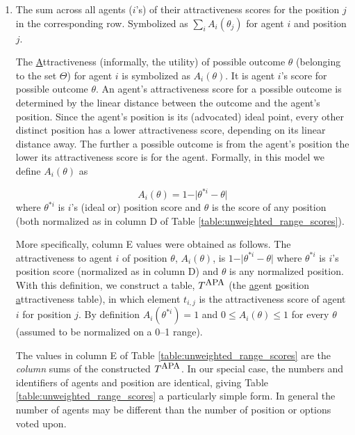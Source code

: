 \begin{enumerate}
\item  The sum across all agents ($i$'s) of their   {attractiveness} scores for the   {position} $j$ in the corresponding row. Symbolized as $\sum_i A_i(\theta_j)$ for agent $i$ and position $j$.

The \underline{A}ttractiveness (informally, the utility) of possible outcome $\theta$ (belonging to the set $\Theta$) for agent $i$ is symbolized as $A_i(\theta)$. It is agent $i$'s score for possible outcome $\theta$. An agent's   {attractiveness} score for a possible outcome is determined by the linear distance between the outcome and the agent's   {position}. Since the agent's   {position} is its (advocated) ideal point, every other distinct position has a lower   {attractiveness} score, depending on its linear distance away. The further a possible outcome is from the agent's   {position} the lower its   {attractiveness} score is for the agent. Formally, in this model we define $A_i(\theta)$ as

\begin{equation}
A_i(\theta) = 1-\vert \theta^{*i} - \theta\vert 
\end{equation}
 where $\theta^{*i}$ is $i$'s (ideal or)   {position} score and $\theta$ is the score of any   {position} (both normalized as in column D of Table \ref{table:unweighted_range_scores}). %
 
 More specifically, column E values were obtained as follows.  The   {attractiveness} to agent $i$ of   {position} $\theta$, $A_i(\theta)$, is $1-\vert \theta^{*i} - \theta\vert$ where $\theta^{*i}$ is $i$'s   {position} score (normalized as in column D) and $\theta$ is any normalized   {position}. With this definition, we construct a table, $T^{\mbox{\small APA}}$ (the \underline{a}gent \underline{p}osition \underline{a}ttractiveness table), %
 in which element $t_{i,j}$ is the   {attractiveness}  score of agent $i$ for   {position} $j$.  By definition $A_i(\theta^{*i}) = 1$ and $0 \le A_i(\theta) \le 1$ for every $\theta$ (assumed to be normalized on a 0--1 range).

The values in column E of Table \ref{table:unweighted_range_scores} are  the \emph{column} sums of the constructed $T^{\mbox{\small APA}}$.  In our special case, the numbers and identifiers of agents and   {position} are identical, giving Table \ref{table:unweighted_range_scores} a particularly simple form. In general the number of agents may be different than the number of   {position} or options voted upon.


\end{enumerate}
